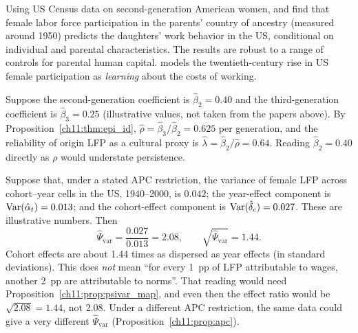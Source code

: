 \documentclass[../structural_economics_book.tex]{subfiles}
\begin{document}
\begin{stylizedfact}\label{ch11:prop:fernandez}
Using US Census data on second-generation American women, \citet[\textit{AEJ: Macro}]{fernandez2009culture} and \citet[\textit{JEEA}]{fernandez2007women} find that female labor force participation in the parents' country of ancestry (measured around 1950) predicts the daughters' work behavior in the US, conditional on individual and parental characteristics. The results are robust to a range of controls for parental human capital. \citet[\textit{AER}]{fernandez2013cultural} models the twentieth-century rise in US female participation as \textit{learning} about the costs of working.
\end{stylizedfact}

\begin{example}\label{ch11:ex:epi}
Suppose the second-generation coefficient is $\hat{\beta}_2 = 0.40$ and the third-generation coefficient is $\hat{\beta}_3 = 0.25$ (illustrative values, not taken from the papers above). By Proposition~\ref{ch11:thm:epi_id}, $\hat{\rho} = \hat{\beta}_3/\hat{\beta}_2 = 0.625$ per generation, and the reliability of origin LFP as a cultural proxy is $\hat{\lambda} = \hat{\beta}_2/\hat{\rho} = 0.64$. Reading $\hat{\beta}_2 = 0.40$ directly as $\rho$ would understate persistence.
\end{example}

\begin{example}\label{ch11:ex:psi_lfp}
Suppose that, under a stated APC restriction, the variance of female LFP across cohort--year cells in the US, 1940--2000, is $0.042$; the year-effect component is $\operatorname{Var}(\hat{\alpha}_t) = 0.013$; and the cohort-effect component is $\operatorname{Var}(\hat{\delta}_c) = 0.027$. These are illustrative numbers. Then
\begin{equation}
\hat{\Psi}_{\text{var}} = \frac{0.027}{0.013} = 2.08, \qquad \sqrt{\hat{\Psi}_{\text{var}}} = 1.44.
\end{equation}
Cohort effects are about 1.44 times as dispersed as year effects (in standard deviations). This does \textit{not} mean ``for every 1~pp of LFP attributable to wages, another 2~pp are attributable to norms''. That reading would need Proposition~\ref{ch11:prop:psivar_map}, and even then the effect ratio would be $\sqrt{2.08} = 1.44$, not 2.08. Under a different APC restriction, the same data could give a very different $\hat{\Psi}_{\text{var}}$ (Proposition~\ref{ch11:prop:apc}).
\end{example}
\end{document}
